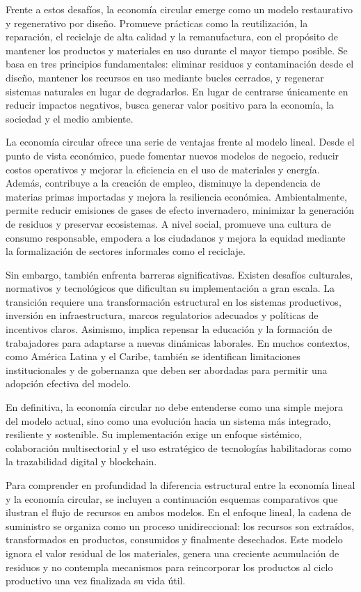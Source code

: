 Frente a estos desafíos, la economía circular emerge como un modelo restaurativo y regenerativo por diseño. Promueve prácticas como la reutilización, la reparación, el reciclaje de alta calidad y la remanufactura, con el propósito de mantener los productos y materiales en uso durante el mayor tiempo posible. Se basa en tres principios fundamentales: eliminar residuos y contaminación desde el diseño, mantener los recursos en uso mediante bucles cerrados, y regenerar sistemas naturales en lugar de degradarlos. En lugar de centrarse únicamente en reducir impactos negativos, busca generar valor positivo para la economía, la sociedad y el medio ambiente.

La economía circular ofrece una serie de ventajas frente al modelo lineal. Desde el punto de vista económico, puede fomentar nuevos modelos de negocio, reducir costos operativos y mejorar la eficiencia en el uso de materiales y energía. Además, contribuye a la creación de empleo, disminuye la dependencia de materias primas importadas y mejora la resiliencia económica. Ambientalmente, permite reducir emisiones de gases de efecto invernadero, minimizar la generación de residuos y preservar ecosistemas. A nivel social, promueve una cultura de consumo responsable, empodera a los ciudadanos y mejora la equidad mediante la formalización de sectores informales como el reciclaje.

Sin embargo, también enfrenta barreras significativas. Existen desafíos culturales, normativos y tecnológicos que dificultan su implementación a gran escala. La transición requiere una transformación estructural en los sistemas productivos, inversión en infraestructura, marcos regulatorios adecuados y políticas de incentivos claros. Asimismo, implica repensar la educación y la formación de trabajadores para adaptarse a nuevas dinámicas laborales. En muchos contextos, como América Latina y el Caribe, también se identifican limitaciones institucionales y de gobernanza que deben ser abordadas para permitir una adopción efectiva del modelo.

En definitiva, la economía circular no debe entenderse como una simple mejora del modelo actual, sino como una evolución hacia un sistema más integrado, resiliente y sostenible. Su implementación exige un enfoque sistémico, colaboración multisectorial y el uso estratégico de tecnologías habilitadoras como la trazabilidad digital y blockchain.


Para comprender en profundidad la diferencia estructural entre la economía lineal y la economía circular, se incluyen a continuación esquemas comparativos que ilustran el flujo de recursos en ambos modelos. En el enfoque lineal, la cadena de suministro se organiza como un proceso unidireccional: los recursos son extraídos, transformados en productos, consumidos y finalmente desechados. Este modelo ignora el valor residual de los materiales, genera una creciente acumulación de residuos y no contempla mecanismos para reincorporar los productos al ciclo productivo una vez finalizada su vida útil.

